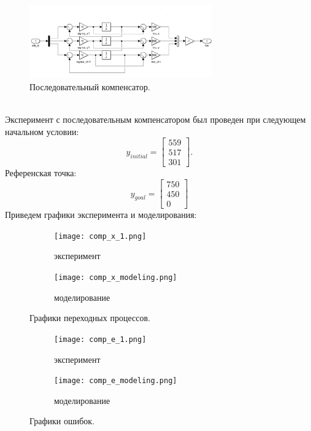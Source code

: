 \documentclass[12pt]{article}
\begin{document}
\begin{figure}[H]
    \centering
    \includegraphics[width=0.7\textwidth]{compensator_scheme.png}
    \caption{Последовательный компенсатор.}
    \label{fig:compensator_scheme.png}
\end{figure}\\

Эксперимент с последовательным компенсатором был проведен при следующем начальном условии:
\[
y_{initial} = \begin{bmatrix}
    559 \\ 517 \\ 301
\end{bmatrix}.
\]
Референская точка:
\[
y_{goal} = \begin{bmatrix}
    750 \\ 450 \\ 0
\end{bmatrix}
\]
Приведем графики эксперимента и моделирования:
\begin{figure}[H]
    \centering
    \begin{subfigure}{0.49\textwidth}
        \centering
        \texttt{[image: comp\_x\_1.png]}
        \caption{эксперимент}
         \label{fig:comp_x_1.png}
     \end{subfigure}
     \hfill
     \begin{subfigure}{0.49\textwidth}
         \centering
         \texttt{[image: comp\_x\_modeling.png]}
         \caption{моделирование}
         \label{fig:comp_x_modeling.png}
     \end{subfigure}
    \caption{Графики переходных процессов.}
    \label{fig:two graphs}
\end{figure}

\begin{figure}[H]
    \centering
    \begin{subfigure}{0.49\textwidth}
        \centering
        \texttt{[image: comp\_e\_1.png]}
        \caption{эксперимент}
         \label{fig:comp_e_1.png}
     \end{subfigure}
     \hfill
     \begin{subfigure}{0.49\textwidth}
         \centering
         \texttt{[image: comp\_e\_modeling.png]}
         \caption{моделирование}
         \label{fig:comp_e_modeling.png}
     \end{subfigure}
    \caption{Графики ошибок.}
    \label{fig:two graphs}
\end{figure}
\end{document}
